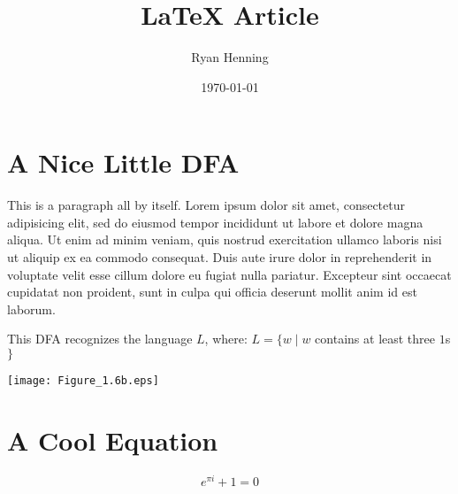 \documentclass{article}
\title{LaTeX Article}
\author{Ryan Henning}
\date{\today}
\begin{document}
\section{A Nice Little DFA}

This is a paragraph all by itself. Lorem ipsum dolor sit amet, consectetur adipisicing elit, sed do eiusmod tempor incididunt ut labore et dolore magna aliqua. Ut enim ad minim veniam, quis nostrud exercitation ullamco laboris nisi ut aliquip ex ea commodo consequat. Duis aute irure dolor in reprehenderit in voluptate velit esse cillum dolore eu fugiat nulla pariatur. Excepteur sint occaecat cupidatat non proident, sunt in culpa qui officia deserunt mollit anim id est laborum.

This DFA recognizes the language $L$, where:
$L = \{w \mid w$ contains at least three $1$s$\}$
\begin{center}
\texttt{[image: Figure\_1.6b.eps]}
\end{center}


\section{A Cool Equation}

$$e^{\pi i} + 1 = 0$$
\end{document}
